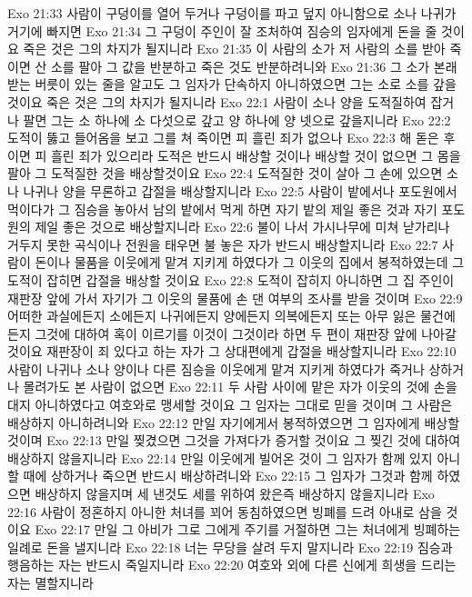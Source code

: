 Exo 21:33  사람이 구덩이를 열어 두거나 구덩이를 파고 덮지 아니함으로 소나 나귀가 거기에 빠지면
Exo 21:34  그 구덩이 주인이 잘 조처하여 짐승의 임자에게 돈을 줄 것이요 죽은 것은 그의 차지가 될지니라
Exo 21:35  이 사람의 소가 저 사람의 소를 받아 죽이면 산 소를 팔아 그 값을 반분하고 죽은 것도 반분하려니와
Exo 21:36  그 소가 본래 받는 버릇이 있는 줄을 알고도 그 임자가 단속하지 아니하였으면 그는 소로 소를 갚을 것이요 죽은 것은 그의 차지가 될지니라
Exo 22:1  사람이 소나 양을 도적질하여 잡거나 팔면 그는 소 하나에 소 다섯으로 갚고 양 하나에 양 넷으로 갚을지니라
Exo 22:2  도적이 뚫고 들어옴을 보고 그를 쳐 죽이면 피 흘린 죄가 없으나
Exo 22:3  해 돋은 후이면 피 흘린 죄가 있으리라 도적은 반드시 배상할 것이나 배상할 것이 없으면 그 몸을 팔아 그 도적질한 것을 배상할것이요
Exo 22:4  도적질한 것이 살아 그 손에 있으면 소나 나귀나 양을 무론하고 갑절을 배상할지니라
Exo 22:5  사람이 밭에서나 포도원에서 먹이다가 그 짐승을 놓아서 남의 밭에서 먹게 하면 자기 밭의 제일 좋은 것과 자기 포도원의 제일 좋은 것으로 배상할지니라
Exo 22:6  불이 나서 가시나무에 미쳐 낟가리나 거두지 못한 곡식이나 전원을 태우면 불 놓은 자가 반드시 배상할지니라
Exo 22:7  사람이 돈이나 물품을 이웃에게 맡겨 지키게 하였다가 그 이웃의 집에서 봉적하였는데 그 도적이 잡히면 갑절을 배상할 것이요
Exo 22:8  도적이 잡히지 아니하면 그 집 주인이 재판장 앞에 가서 자기가 그 이웃의 물품에 손 댄 여부의 조사를 받을 것이며
Exo 22:9  어떠한 과실에든지 소에든지 나귀에든지 양에든지 의복에든지 또는 아무 잃은 물건에든지 그것에 대하여 혹이 이르기를 이것이 그것이라 하면 두 편이 재판장 앞에 나아갈 것이요 재판장이 죄 있다고 하는 자가 그 상대편에게 갑절을 배상할지니라
Exo 22:10  사람이 나귀나 소나 양이나 다른 짐승을 이웃에게 맡겨 지키게 하였다가 죽거나 상하거나 몰려가도 본 사람이 없으면
Exo 22:11  두 사람 사이에 맡은 자가 이웃의 것에 손을 대지 아니하였다고 여호와로 맹세할 것이요 그 임자는 그대로 믿을 것이며 그 사람은 배상하지 아니하려니와
Exo 22:12  만일 자기에게서 봉적하였으면 그 임자에게 배상할 것이며
Exo 22:13  만일 찢겼으면 그것을 가져다가 증거할 것이요 그 찢긴 것에 대하여 배상하지 않을지니라
Exo 22:14  만일 이웃에게 빌어온 것이 그 임자가 함께 있지 아니할 때에 상하거나 죽으면 반드시 배상하려니와
Exo 22:15  그 임자가 그것과 함께 하였으면 배상하지 않을지며 세 낸것도 세를 위하여 왔은즉 배상하지 않을지니라
Exo 22:16  사람이 정혼하지 아니한 처녀를 꾀어 동침하였으면 빙폐를 드려 아내로 삼을 것이요
Exo 22:17  만일 그 아비가 그로 그에게 주기를 거절하면 그는 처녀에게 빙폐하는 일례로 돈을 낼지니라
Exo 22:18  너는 무당을 살려 두지 말지니라
Exo 22:19  짐승과 행음하는 자는 반드시 죽일지니라
Exo 22:20  여호와 외에 다른 신에게 희생을 드리는 자는 멸할지니라
